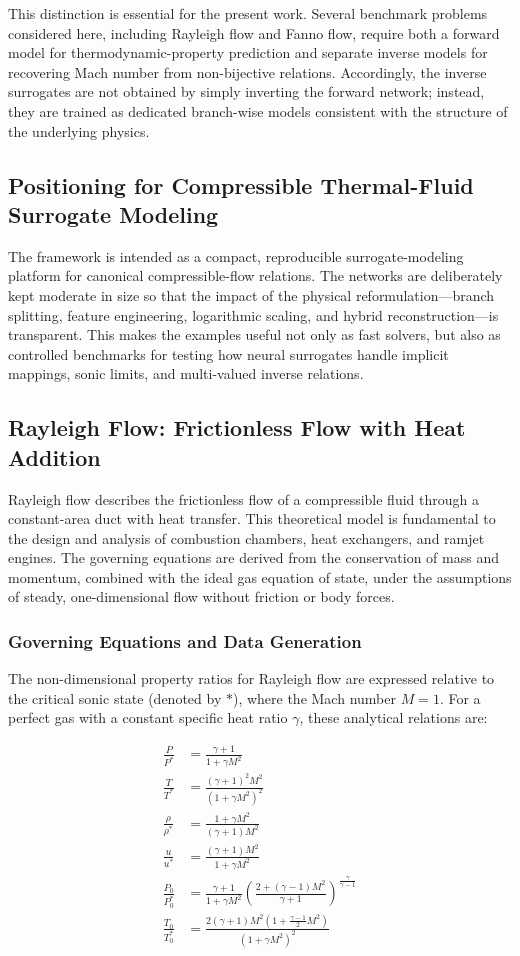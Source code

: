\documentclass[preprint,12pt]{elsarticle}
\begin{document}
This distinction is essential for the present work. Several benchmark problems considered here, including Rayleigh flow and Fanno flow, require both a forward model for thermodynamic-property prediction and separate inverse models for recovering Mach number from non-bijective relations. Accordingly, the inverse surrogates are not obtained by simply inverting the forward network; instead, they are trained as dedicated branch-wise models consistent with the structure of the underlying physics.

\subsection{Positioning for Compressible Thermal-Fluid Surrogate Modeling}
The framework is intended as a compact, reproducible surrogate-modeling platform for canonical compressible-flow relations. The networks are deliberately kept moderate in size so that the impact of the physical reformulation---branch splitting, feature engineering, logarithmic scaling, and hybrid reconstruction---is transparent. This makes the examples useful not only as fast solvers, but also as controlled benchmarks for testing how neural surrogates handle implicit mappings, sonic limits, and multi-valued inverse relations.

\subsection{Rayleigh Flow: Frictionless Flow with Heat Addition}
Rayleigh flow describes the frictionless flow of a compressible fluid through a constant-area duct with heat transfer. This theoretical model is fundamental to the design and analysis of combustion chambers, heat exchangers, and ramjet engines. The governing equations are derived from the conservation of mass and momentum, combined with the ideal gas equation of state, under the assumptions of steady, one-dimensional flow without friction or body forces.

\subsubsection{Governing Equations and Data Generation}
The non-dimensional property ratios for Rayleigh flow are expressed relative to the critical sonic state (denoted by $*$), where the Mach number $M=1$. For a perfect gas with a constant specific heat ratio $\gamma$, these analytical relations are:

\begin{align}
    \frac{P}{P^*} &= \frac{\gamma+1}{1+\gamma M^2} \\
    \frac{T}{T^*} &= \frac{(\gamma+1)^2 M^2}{(1+\gamma M^2)^2} \\
    \frac{\rho}{\rho^*} &= \frac{1+\gamma M^2}{(\gamma+1)M^2} \\
    \frac{u}{u^*} &= \frac{(\gamma+1)M^2}{1+\gamma M^2} \\
    \frac{P_0}{P_0^*} &= \frac{\gamma+1}{1+\gamma M^2} \left( \frac{2+(\gamma-1)M^2}{\gamma+1} \right)^{\frac{\gamma}{\gamma-1}} \\
    \frac{T_0}{T_0^*} &= \frac{2(\gamma+1)M^2 (1 + \frac{\gamma-1}{2}M^2)}{(1+\gamma M^2)^2}
\end{align}
\end{document}
